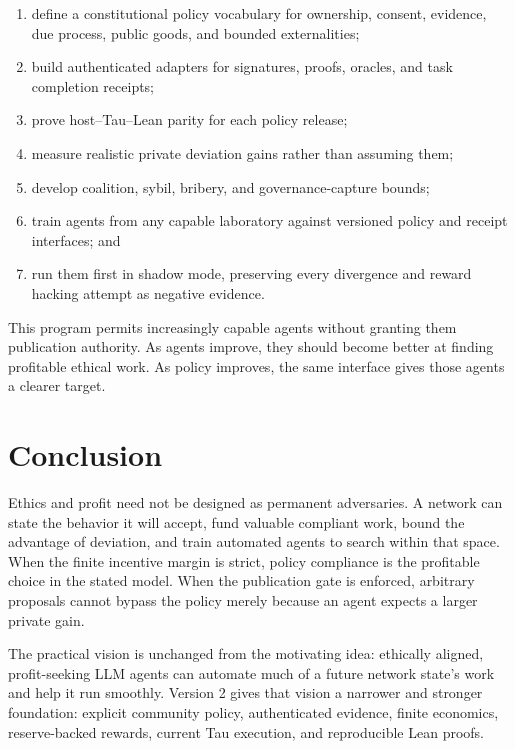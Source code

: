 \documentclass[11pt]{article}
\begin{document}
\begin{enumerate}
  \item define a constitutional policy vocabulary for ownership, consent,
  evidence, due process, public goods, and bounded externalities;
  \item build authenticated adapters for signatures, proofs, oracles, and task
  completion receipts;
  \item prove host--Tau--Lean parity for each policy release;
  \item measure realistic private deviation gains rather than assuming them;
  \item develop coalition, sybil, bribery, and governance-capture bounds;
  \item train agents from any capable laboratory against versioned policy and
  receipt interfaces; and
  \item run them first in shadow mode, preserving every divergence and reward
  hacking attempt as negative evidence.
\end{enumerate}

This program permits increasingly capable agents without granting them
publication authority.  As agents improve, they should become better at finding
profitable ethical work.  As policy improves, the same interface gives those
agents a clearer target.

\section{Conclusion}

Ethics and profit need not be designed as permanent adversaries.  A network can
state the behavior it will accept, fund valuable compliant work, bound the
advantage of deviation, and train automated agents to search within that space.
When the finite incentive margin is strict, policy compliance is the profitable
choice in the stated model.  When the publication gate is enforced, arbitrary
proposals cannot bypass the policy merely because an agent expects a larger
private gain.

The practical vision is unchanged from the motivating idea: ethically aligned,
profit-seeking LLM agents can automate much of a future network state's work and
help it run smoothly.  Version 2 gives that vision a narrower and stronger
foundation: explicit community policy, authenticated evidence, finite economics,
reserve-backed rewards, current Tau execution, and reproducible Lean proofs.



\end{document}
